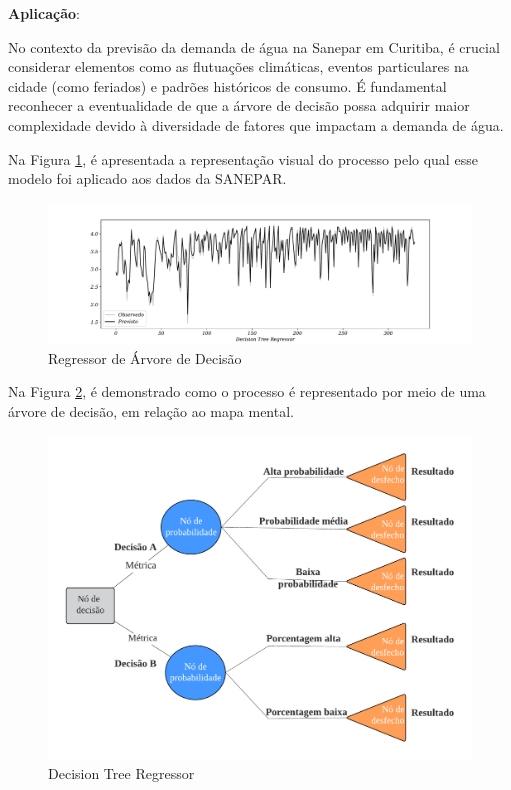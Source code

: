 \textbf{Aplicação}:

No contexto da previsão da demanda de água na Sanepar em Curitiba, é crucial considerar elementos como as flutuações climáticas, eventos particulares na cidade (como feriados) e padrões históricos de consumo. É fundamental reconhecer a eventualidade de que a árvore de decisão possa adquirir maior complexidade devido à diversidade de fatores que impactam a demanda de água.

Na Figura \ref{fig:decision-tree-regressor}, é apresentada a representação visual do processo pelo qual esse modelo foi aplicado aos dados da SANEPAR.

\begin{figure}[!htb]
	\centering
	\caption{Regressor de \'Arvore de Decis\~ao }\label{fig:decision-tree-regressor}
	\includegraphics[width=1\linewidth]{Apendices/Figuras/modelagem-24h/Decision-Tree-Regressor}
	
\end{figure}

Na Figura \ref{fig:arvore-de-decisao}, é demonstrado como o processo é representado por meio de uma árvore de decisão, em relação ao mapa mental.

\begin{figure}[!ht]
	\centering
	\caption{Decision Tree Regressor}
	\label{fig:arvore-de-decisao}
	\includegraphics[width=0.7\linewidth]{"Apendices/Figuras/modelagem-24h/Árvore de decisão"}
	
\end{figure}




